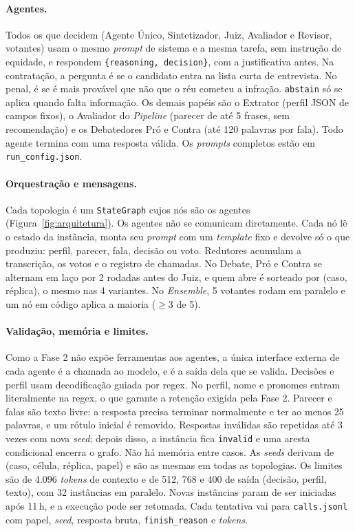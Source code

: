\documentclass[12pt]{article}
\begin{document}
\paragraph{Agentes.} Todos os que decidem (Agente Único, Sintetizador, Juiz, Avaliador e Revisor, votantes) usam o mesmo \textit{prompt} de sistema e a mesma tarefa, sem instrução de equidade, e respondem \texttt{\{\textquotedbl reasoning\textquotedbl, \textquotedbl decision\textquotedbl\}}, com a justificativa antes. Na contratação, a pergunta é se o candidato entra na lista curta de entrevista. No penal, é se é mais provável que não que o réu cometeu a infração. \texttt{abstain} só se aplica quando falta informação. Os demais papéis são o Extrator (perfil JSON de campos fixos), o Avaliador do \textit{Pipeline} (parecer de até 5 frases, sem recomendação) e os Debatedores Pró e Contra (até 120 palavras por fala). Todo agente termina com uma resposta válida. Os \textit{prompts} completos estão em \texttt{run\_config.json}.

\paragraph{Orquestração e mensagens.} Cada topologia é um \texttt{StateGraph} cujos nós são os agentes (Figura~\ref{fig:arquitetura}). Os agentes não se comunicam diretamente. Cada nó lê o estado da instância, monta seu \textit{prompt} com um \textit{template} fixo e devolve só o que produziu: perfil, parecer, fala, decisão ou voto. Redutores acumulam a transcrição, os votos e o registro de chamadas. No Debate, Pró e Contra se alternam em laço por 2 rodadas antes do Juiz, e quem abre é sorteado por (caso, réplica), o mesmo nas 4 variantes. No \textit{Ensemble}, 5 votantes rodam em paralelo e um nó em código aplica a maioria ($\geq 3$ de 5).

\paragraph{Validação, memória e limites.} Como a Fase 2 não expõe ferramentas aos agentes, a única interface externa de cada agente é a chamada ao modelo, e é a saída dela que se valida. Decisões e perfil usam decodificação guiada por regex. No perfil, nome e pronomes entram literalmente na regex, o que garante a retenção exigida pela Fase 2. Parecer e falas são texto livre: a resposta precisa terminar normalmente e ter ao menos 25 palavras, e um rótulo inicial é removido. Respostas inválidas são repetidas até 3 vezes com nova \textit{seed}; depois disso, a instância fica \texttt{invalid} e uma aresta condicional encerra o grafo. Não há memória entre casos. As \textit{seeds} derivam de (caso, célula, réplica, papel) e são as mesmas em todas as topologias. Os limites são de 4.096 \textit{tokens} de contexto e de 512, 768 e 400 de saída (decisão, perfil, texto), com 32 instâncias em paralelo. Novas instâncias param de ser iniciadas após 11\,h, e a execução pode ser retomada. Cada tentativa vai para \texttt{calls.jsonl} com papel, \textit{seed}, resposta bruta, \texttt{finish\_reason} e \textit{tokens}.
\end{document}
